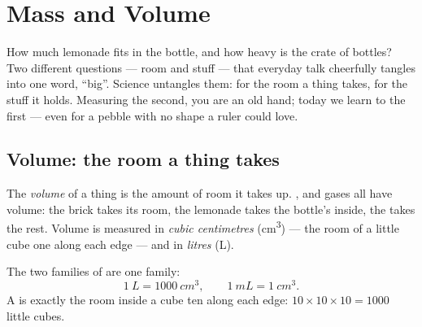 \chapter{Mass and Volume}\label{ch:g6:mass-and-volume}

How much lemonade fits in the bottle, and how heavy is the crate of
bottles? Two different questions --- room and stuff --- that
everyday talk cheerfully tangles into one word, ``big''. Science
untangles them:  for the room a thing takes,  for the
stuff it holds. Measuring the second, you are an old hand; today we
learn to  the first --- even for a pebble with no shape a
ruler could love.

\section{Volume: the room a thing takes}

\begin{definition}[Volume]\label{def:g6:mass-and-volume:volume}
The \emph{volume} of a thing is the amount of room it
takes up. ,  and gases all have volume: the brick
takes its room, the lemonade takes the bottle's inside, the 
takes the rest. Volume is measured in \emph{cubic
centimetres} (\unit{cm^3}) --- the room of
a little cube one  along each edge --- and in
\emph{litres} (\unit{L}).
\end{definition}

\begin{proposition}\label{prop:g6:mass-and-volume:litre}
The two families of   are one family:
\[
\qty{1}{L} = \qty{1000}{cm^3},
\qquad
\qty{1}{mL} = \qty{1}{cm^3}.
\]
A  is exactly the room inside a cube ten  along
each edge: $10 \times 10 \times 10 = 1000$ little cubes.
\end{proposition}

